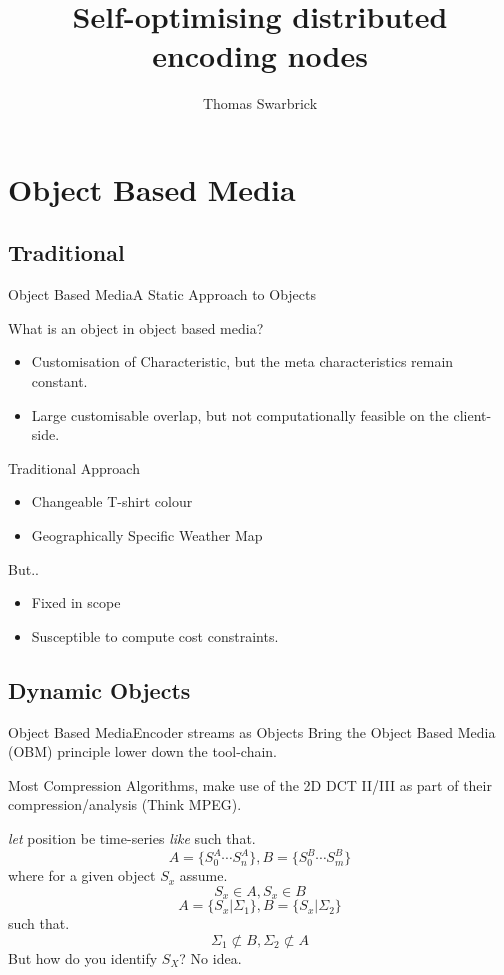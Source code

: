 \documentclass{beamer}
\title{Self-optimising distributed encoding nodes}
\author{Thomas Swarbrick}
\begin{document}
\maketitle
\section{Object Based Media}
\subsection{Traditional}
\begin{frame}[t]{Object Based Media}{A Static Approach to Objects}
  \begin{alertblock}{What is an object in object based media?}
    \begin{itemize}
\item Customisation of Characteristic, but the meta characteristics remain constant.
      \item Large customisable overlap, but not computationally feasible on the client-side.
    \end{itemize}

  \end{alertblock}
  \pause
  \begin{exampleblock}{Traditional Approach}
    \begin{itemize}
\item Changeable T-shirt colour
\item Geographically Specific Weather Map
    \end{itemize}

  \end{exampleblock}
  \pause
  But..
  \pause
    \begin{itemize}
\item Fixed in scope
      \item Susceptible to compute cost constraints.
    \end{itemize}
    \pause

\end{frame}
  \subsection{Dynamic Objects}
  \begin{frame}[t]{Object Based Media}{Encoder streams as Objects}
    Bring the Object Based Media (OBM) principle lower down the tool-chain.

    Most Compression Algorithms, make use of the 2D DCT II/III as part of their compression/analysis (Think MPEG).

    \begin{theorem}
      \emph{let} position be time-series \emph{like} such that.
      \[A = \{S^{A}_{0}\cdots S^{A}_{n}\}, B = \{S^{B}_{0}\cdots S^{B}_{m}\}\]
      where for a given object $S_{x}$ assume. \[ S_{x} \in A, S_{x} \in B\]
      \[  A =\{S_{x} | \Sigma_{1} \}, B = \{S_{x} | \Sigma_{2}\}\]
      such that.
      \[\Sigma_{1} \not\subset B, \Sigma_{2} \not\subset A\]
      \pause
     But how do you identify $S_{X}$? No idea.
    \end{theorem}
  \end{frame}
\end{document}
